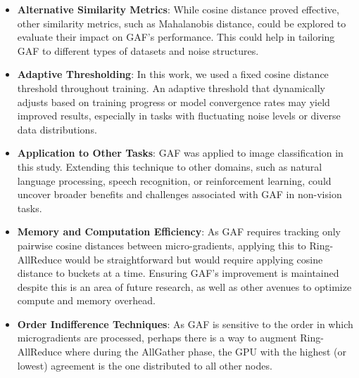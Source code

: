 \begin{itemize}
    \item \textbf{Alternative Similarity Metrics}: While cosine distance proved effective, other similarity metrics, such as Mahalanobis distance, could be explored to evaluate their impact on GAF’s performance. This could help in tailoring GAF to different types of datasets and noise structures.

    \item \textbf{Adaptive Thresholding}: In this work, we used a fixed cosine distance threshold throughout training. An adaptive threshold that dynamically adjusts based on training progress or model convergence rates may yield improved results, especially in tasks with fluctuating noise levels or diverse data distributions.


    \item \textbf{Application to Other Tasks}: GAF was applied to image classification in this study. Extending this technique to other domains, such as natural language processing, speech recognition, or reinforcement learning, could uncover broader benefits and challenges associated with GAF in non-vision tasks. 

    \item \textbf{Memory and Computation Efficiency}: As GAF requires tracking only pairwise cosine distances between micro-gradients, applying this to Ring-AllReduce would be straightforward but would require applying cosine distance to buckets at a time. Ensuring GAF's improvement is maintained despite this is an area of future research, as well as other avenues to optimize compute and memory overhead.
    
    \item \textbf{Order Indifference Techniques}: As GAF is sensitive to the order in which microgradients are processed, perhaps there is a way to augment Ring-AllReduce where during the AllGather phase, the GPU with the highest (or lowest) agreement is the one distributed to all other nodes. 


\end{itemize}
